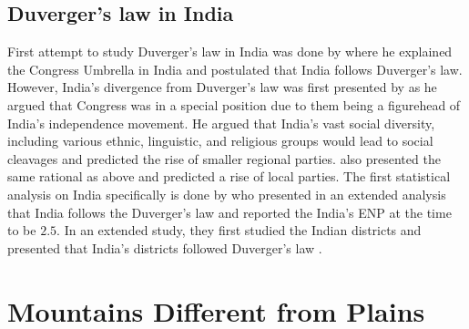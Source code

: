 \subsection{Duverger's law in India}

First attempt to study Duverger's law in India was done by \cite{riker1982two,riker1976number} where he explained the Congress Umbrella in India and postulated that India follows Duverger's law. However, India's divergence from Duverger's law was first presented by \cite{lijphart1994} as he argued that Congress was in a special position due to them being a figurehead of India's independence movement. He argued that India's vast social diversity, including various ethnic, linguistic, and religious groups would lead to social cleavages and predicted the rise of smaller regional parties. \cite{taagepera1989seats,sridharan1997duverger} also presented the same rational as above and predicted a rise of local parties. The first statistical analysis on India specifically is done by \cite{chhibber1998party} who presented in an extended analysis that India follows the Duverger's law and reported the India's ENP at the time to be $2.5$. In an extended study, they first studied the Indian districts and presented that India's districts followed Duverger's law \citep{chhibber2009formation}. 

\section{Mountains Different from Plains}
